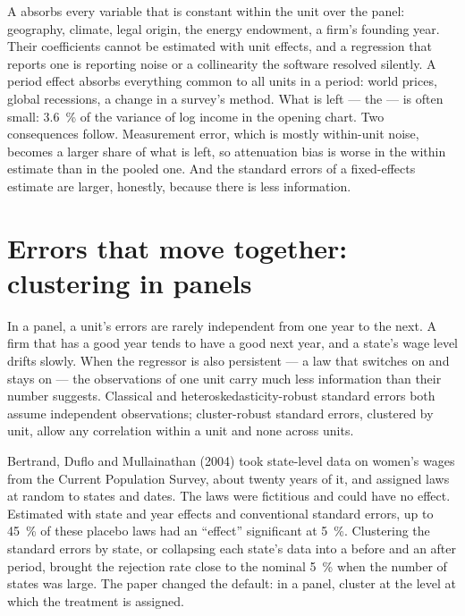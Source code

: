 \begin{measure}
A  absorbs every variable that is constant within the unit
over the panel: geography, climate, legal origin, the energy endowment, a
firm's founding year. Their coefficients cannot be estimated with unit effects,
and a regression that reports one is reporting noise or a collinearity the
software resolved silently. A period effect absorbs everything common to all
units in a period: world prices, global recessions, a change in a survey's
method. What is left --- the  --- is often small: 3.6~\%
of the variance of log income in the opening chart. %
Two consequences follow. Measurement error, which is mostly within-unit noise,
becomes a larger share of what is left, so attenuation bias is worse in the
within estimate than in the pooled one. And the standard errors of a
fixed-effects estimate are larger, honestly, because there is less information.
\end{measure}

\section{Errors that move together: clustering in panels}\label{sec:b3:panel-data:clustering}

In a panel, a unit's errors are rarely independent from one year to the next. A
firm that has a good year tends to have a good next year, and a state's wage
level drifts slowly. When the regressor is also persistent --- a law that
switches on and stays on --- the observations of one unit carry much less
information than their number suggests. Classical and heteroskedasticity-robust
standard errors both assume independent observations; cluster-robust
standard errors, clustered by unit, allow any correlation within a unit and
none across units.

\begin{record}
Bertrand, Duflo and Mullainathan (2004) took state-level data on women's wages
from the Current Population Survey, about twenty years of it, and assigned
laws at random to states and dates. The laws were fictitious and could have no
effect. Estimated with state and year effects and conventional standard
errors, up to 45~\% of these placebo laws had an ``effect'' significant at
5~\%. %
Clustering the standard errors by state, or collapsing each state's data into a
before and an after period, brought the rejection rate close to the nominal 5~\%
when the number of states was large. The paper changed the default: in a panel,
cluster at the level at which the treatment is assigned.
\end{record}

